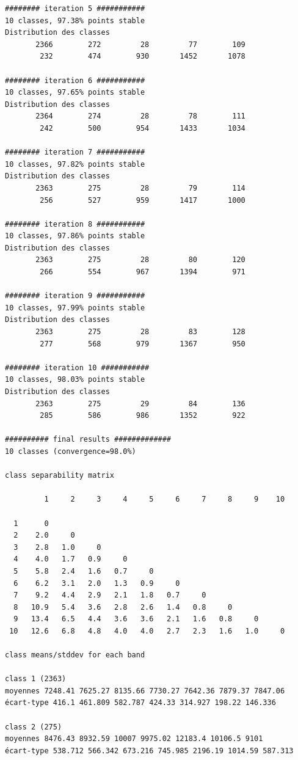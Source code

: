 \documentclass[land,article,submit,pdftex,moreauthors]{Definitions/mdpi}
\begin{document}
\begin{scriptsize}
\begin{verbatim}
######## iteration 5 ###########
10 classes, 97.38% points stable
Distribution des classes
       2366        272         28         77        109
        232        474        930       1452       1078

######## iteration 6 ###########
10 classes, 97.65% points stable
Distribution des classes
       2364        274         28         78        111
        242        500        954       1433       1034

######## iteration 7 ###########
10 classes, 97.82% points stable
Distribution des classes
       2363        275         28         79        114
        256        527        959       1417       1000

######## iteration 8 ###########
10 classes, 97.86% points stable
Distribution des classes
       2363        275         28         80        120
        266        554        967       1394        971

######## iteration 9 ###########
10 classes, 97.99% points stable
Distribution des classes
       2363        275         28         83        128
        277        568        979       1367        950

######## iteration 10 ###########
10 classes, 98.03% points stable
Distribution des classes
       2363        275         29         84        136
        285        586        986       1352        922

########## final results #############
10 classes (convergence=98.0%)

class separability matrix

         1     2     3     4     5     6     7     8     9    10

  1      0
  2    2.0     0
  3    2.8   1.0     0
  4    4.0   1.7   0.9     0
  5    5.8   2.4   1.6   0.7     0
  6    6.2   3.1   2.0   1.3   0.9     0
  7    9.2   4.4   2.9   2.1   1.8   0.7     0
  8   10.9   5.4   3.6   2.8   2.6   1.4   0.8     0
  9   13.4   6.5   4.4   3.6   3.6   2.1   1.6   0.8     0
 10   12.6   6.8   4.8   4.0   4.0   2.7   2.3   1.6   1.0     0

class means/stddev for each band

class 1 (2363)
moyennes 7248.41 7625.27 8135.66 7730.27 7642.36 7879.37 7847.06
écart-type 416.1 461.809 582.787 424.33 314.927 198.22 146.336

class 2 (275)
moyennes 8476.43 8932.59 10007 9975.02 12183.4 10106.5 9101
écart-type 538.712 566.342 673.216 745.985 2196.19 1014.59 587.313


\end{verbatim}
\end{scriptsize}
\end{document}
